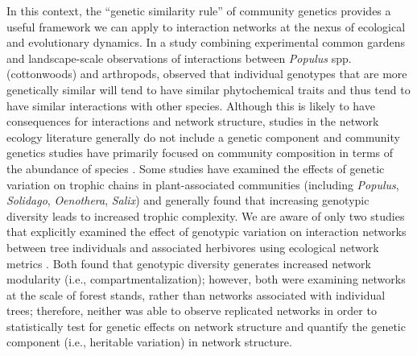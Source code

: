 \documentclass[fleqn,12pt]{olplainarticle}
\begin{document}
In this context, the ``genetic similarity rule'' of community genetics
provides a useful framework we can apply to interaction networks at
the nexus of ecological and evolutionary dynamics. In a study
combining experimental common gardens and landscape-scale observations
of interactions between \textit{Populus} spp.  (cottonwoods) and
arthropods, \cite{Bangert2006} observed that individual genotypes that
are more genetically similar will tend to have similar phytochemical
traits and thus tend to have similar interactions with other
species. Although this is likely to have consequences for interactions
and network structure, studies in the network ecology literature
generally do not include a genetic component \citep{Lau2017a} and
community genetics studies have primarily focused on community
composition in terms of the abundance of species
\citep{DesRoches2018TheVariation}. Some studies have examined the
effects of genetic variation on trophic chains in plant-associated
communities (including \textit{Populus}, \textit{Solidago},
\textit{Oenothera}, \textit{Salix})
\citep{Bailey2006fix, Johnson2008, Smith2011,
  Smith2015b, Barbour2016GeneticComplexity} and generally found that
increasing genotypic diversity leads to increased trophic
complexity. We are aware of only two studies that explicitly examined
the effect of genotypic variation on interaction networks between tree
individuals and associated herbivores using ecological network metrics
\citep{Lau2016afix, Keith2017}. Both found that genotypic diversity
generates increased network modularity (i.e., compartmentalization);
however, both were examining networks at the scale of forest stands,
rather than networks associated with individual trees; therefore,
neither was able to observe replicated networks in order to
statistically test for genetic effects on network structure and
quantify the genetic component (i.e., heritable variation) in network
structure.
\end{document}
